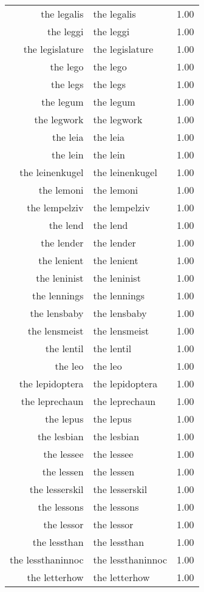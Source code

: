 \begin{table}[ht]
\begin{tabular}{rlr}
  the legalis & the legalis & 1.00 \\ 
  the leggi & the leggi & 1.00 \\ 
  the legislature & the legislature & 1.00 \\ 
  the lego & the lego & 1.00 \\ 
  the legs & the legs & 1.00 \\ 
  the legum & the legum & 1.00 \\ 
  the legwork & the legwork & 1.00 \\ 
  the leia & the leia & 1.00 \\ 
  the lein & the lein & 1.00 \\ 
  the leinenkugel & the leinenkugel & 1.00 \\ 
  the lemoni & the lemoni & 1.00 \\ 
  the lempelziv & the lempelziv & 1.00 \\ 
  the lend & the lend & 1.00 \\ 
  the lender & the lender & 1.00 \\ 
  the lenient & the lenient & 1.00 \\ 
  the leninist & the leninist & 1.00 \\ 
  the lennings & the lennings & 1.00 \\ 
  the lensbaby & the lensbaby & 1.00 \\ 
  the lensmeist & the lensmeist & 1.00 \\ 
  the lentil & the lentil & 1.00 \\ 
  the leo & the leo & 1.00 \\ 
  the lepidoptera & the lepidoptera & 1.00 \\ 
  the leprechaun & the leprechaun & 1.00 \\ 
  the lepus & the lepus & 1.00 \\ 
  the lesbian & the lesbian & 1.00 \\ 
  the lessee & the lessee & 1.00 \\ 
  the lessen & the lessen & 1.00 \\ 
  the lesserskil & the lesserskil & 1.00 \\ 
  the lessons & the lessons & 1.00 \\ 
  the lessor & the lessor & 1.00 \\ 
  the lessthan & the lessthan & 1.00 \\ 
  the lessthaninnoc & the lessthaninnoc & 1.00 \\ 
  the letterhow & the letterhow & 1.00 \\ 

\end{tabular}
\end{table}
